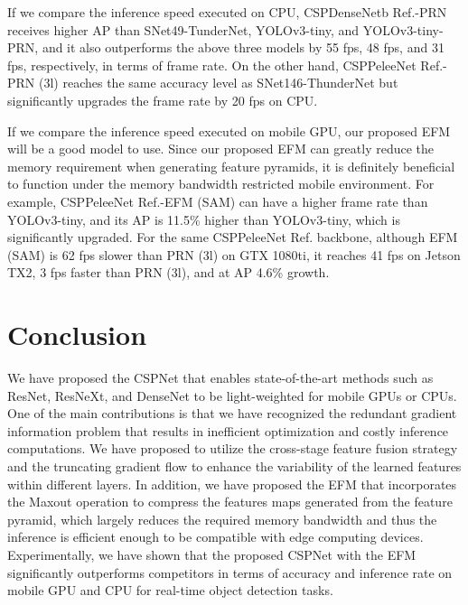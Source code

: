 \documentclass{article}
\begin{document}
If we compare the inference speed executed on CPU, CSPDenseNetb Ref.-PRN receives higher AP than SNet49-TunderNet, YOLOv3-tiny, and YOLOv3-tiny-PRN, and it also outperforms the above three models by 55 fps, 48 fps, and 31 fps, respectively, in terms of frame rate. On the other hand, CSPPeleeNet Ref.-PRN (3l) reaches the same accuracy level as SNet146-ThunderNet but significantly upgrades the frame rate by 20 fps on CPU.

If we compare the inference speed executed on mobile GPU, our proposed EFM will be a good model to use. Since our proposed EFM can greatly reduce the memory requirement when generating feature pyramids, it is definitely beneficial to function under the memory bandwidth restricted mobile environment. For example, CSPPeleeNet Ref.-EFM (SAM) can have a higher frame rate than YOLOv3-tiny, and its AP is 11.5\% higher than YOLOv3-tiny, which is significantly upgraded. For the same CSPPeleeNet Ref. backbone, although EFM (SAM) is 62 fps slower than PRN (3l) on GTX 1080ti, it reaches 41 fps on Jetson TX2, 3 fps faster than PRN (3l), and at AP 4.6\% growth.

\section{Conclusion}

We have proposed the CSPNet that enables state-of-the-art methods such as ResNet, ResNeXt, and DenseNet to be light-weighted for mobile GPUs or CPUs. One of the main contributions is that we have recognized the redundant gradient information problem that results in inefficient optimization and costly inference computations. We have proposed to utilize the cross-stage feature fusion strategy and the truncating gradient flow to enhance the variability of the learned features within different layers. In addition, we have proposed the EFM that incorporates the Maxout operation to compress the features maps generated from the feature pyramid, which largely reduces the required memory bandwidth and thus the inference is efficient enough to be compatible with edge computing devices. Experimentally, we have shown that the proposed CSPNet with the EFM significantly outperforms competitors in terms of accuracy and inference rate on mobile GPU and CPU for real-time object detection tasks.


{\small
	  
	
}
\end{document}
